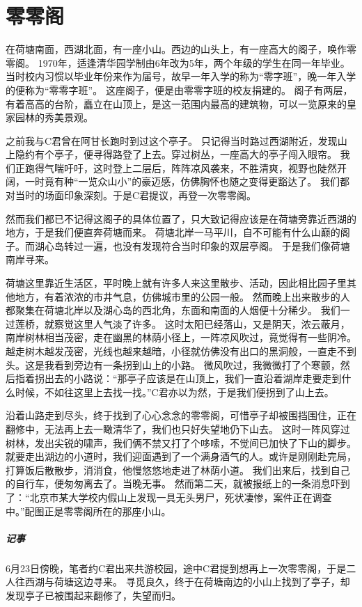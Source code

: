 \chapter{零零阁}

在荷塘南面，西湖北面，有一座小山。西边的山头上，有一座高大的阁子，唤作零零阁。%
1970年，适逢清华园学制由6年改为5年，两个年级的学生在同一年毕业。
当时校内习惯以毕业年份来作为届号，故早一年入学的称为“零字班”，晚一年入学的便称为“零零字班”。
这座阁子，便是由零零字班的校友捐建的。
阁子有两层，有着高高的台阶，矗立在山顶上，是这一范围内最高的建筑物，可以一览原来的皇家园林的秀美景观。

之前我与C君曾在阿甘长跑时到过这个亭子。
只记得当时路过西湖附近，发现山上隐约有个亭子，便寻得路登了上去。穿过树丛，一座高大的亭子闯入眼帘。
我们正跑得气喘吁吁，这时登上二层后，阵阵凉风袭来，不胜清爽，视野也陡然开阔，一时竟有种“一览众山小”的豪迈感，仿佛胸怀也随之变得更豁达了。
我们都对当时的场面印象深刻。于是C君提议，再登一次零零阁。

然而我们都已不记得这阁子的具体位置了，只大致记得应该是在荷塘旁靠近西湖的地方，于是我们便直奔荷塘而来。
荷塘北岸一马平川，自不可能有什么山巅的阁子。而湖心岛转过一遍，也没有发现符合当时印象的双层亭阁。
于是我们像荷塘南岸寻来。

荷塘这里靠近生活区，平时晚上就有许多人来这里散步、活动，因此相比园子里其他地方，有着浓浓的市井气息，仿佛城市里的公园一般。
然而晚上出来散步的人都聚集在荷塘北岸以及湖心岛的西北角，东面和南面的人烟便十分稀少。
我们一过莲桥，就察觉这里人气淡了许多。
这时太阳已经落山，又是阴天，浓云蔽月，南岸树林相当茂密，走在幽黑的林荫小径上，一阵凉风吹过，竟觉得有一些阴冷。
越走树木越发茂密，光线也越来越暗，小径就仿佛没有出口的黑洞般，一直走不到头。这是我看到旁边有一条拐到山上的小路。
微风吹过，我微微打了个寒颤，然后指着拐出去的小路说：“那亭子应该是在山顶上，我们一直沿着湖岸走要走到什么时候，不如往这里上去找一找。”C君亦以为然，于是我们便拐到了山上去。

沿着山路走到尽头，终于找到了心心念念的零零阁，可惜亭子却被围挡围住，正在翻修中，无法再上去一瞰清华了，我们也只好失望地仍下山去。
这时一阵风穿过树林，发出尖锐的啸声，我们俩不禁又打了个哆嗦，不觉间已加快了下山的脚步。
就要走出湖边的小道时，我们迎面遇到了一个满身酒气的人。或许是刚刚赴完局，打算饭后散散步，消消食，他慢悠悠地走进了林荫小道。
我们出来后，找到自己的自行车，便匆匆离去了。当晚无事。
然而第二天，就被报纸上的一条消息吓到了：“北京市某大学校内假山上发现一具无头男尸，死状凄惨，案件正在调查中。”配图正是零零阁所在的那座小山。

\vfill

\paragraph{记事}
6月23日傍晚，笔者约C君出来共游校园，途中C君提到想再上一次零零阁，于是二人往西湖与荷塘这边寻来。
寻觅良久，终于在荷塘南边的小山上找到了亭子，却发现亭子已被围起来翻修了，失望而归。
